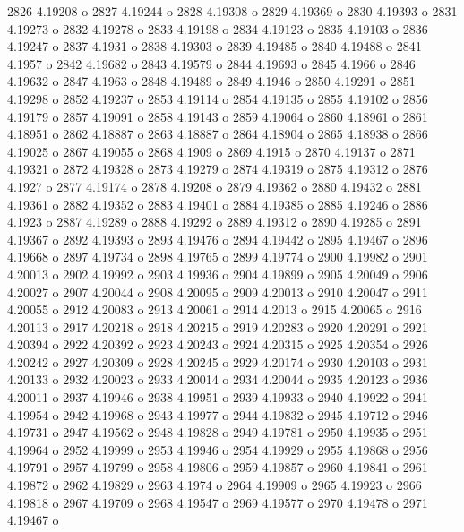  2826  4.19208  o
 2827  4.19244  o
 2828  4.19308  o
 2829  4.19369  o
 2830  4.19393  o
 2831  4.19273  o
 2832  4.19278  o
 2833  4.19198  o
 2834  4.19123  o
 2835  4.19103  o
 2836  4.19247  o
 2837  4.1931  o
 2838  4.19303  o
 2839  4.19485  o
 2840  4.19488  o
 2841  4.1957  o
 2842  4.19682  o
 2843  4.19579  o
 2844  4.19693  o
 2845  4.1966  o
 2846  4.19632  o
 2847  4.1963  o
 2848  4.19489  o
 2849  4.1946  o
 2850  4.19291  o
 2851  4.19298  o
 2852  4.19237  o
 2853  4.19114  o
 2854  4.19135  o
 2855  4.19102  o
 2856  4.19179  o
 2857  4.19091  o
 2858  4.19143  o
 2859  4.19064  o
 2860  4.18961  o
 2861  4.18951  o
 2862  4.18887  o
 2863  4.18887  o
 2864  4.18904  o
 2865  4.18938  o
 2866  4.19025  o
 2867  4.19055  o
 2868  4.1909  o
 2869  4.1915  o
 2870  4.19137  o
 2871  4.19321  o
 2872  4.19328  o
 2873  4.19279  o
 2874  4.19319  o
 2875  4.19312  o
 2876  4.1927  o
 2877  4.19174  o
 2878  4.19208  o
 2879  4.19362  o
 2880  4.19432  o
 2881  4.19361  o
 2882  4.19352  o
 2883  4.19401  o
 2884  4.19385  o
 2885  4.19246  o
 2886  4.1923  o
 2887  4.19289  o
 2888  4.19292  o
 2889  4.19312  o
 2890  4.19285  o
 2891  4.19367  o
 2892  4.19393  o
 2893  4.19476  o
 2894  4.19442  o
 2895  4.19467  o
 2896  4.19668  o
 2897  4.19734  o
 2898  4.19765  o
 2899  4.19774  o
 2900  4.19982  o
 2901  4.20013  o
 2902  4.19992  o
 2903  4.19936  o
 2904  4.19899  o
 2905  4.20049  o
 2906  4.20027  o
 2907  4.20044  o
 2908  4.20095  o
 2909  4.20013  o
 2910  4.20047  o
 2911  4.20055  o
 2912  4.20083  o
 2913  4.20061  o
 2914  4.2013  o
 2915  4.20065  o
 2916  4.20113  o
 2917  4.20218  o
 2918  4.20215  o
 2919  4.20283  o
 2920  4.20291  o
 2921  4.20394  o
 2922  4.20392  o
 2923  4.20243  o
 2924  4.20315  o
 2925  4.20354  o
 2926  4.20242  o
 2927  4.20309  o
 2928  4.20245  o
 2929  4.20174  o
 2930  4.20103  o
 2931  4.20133  o
 2932  4.20023  o
 2933  4.20014  o
 2934  4.20044  o
 2935  4.20123  o
 2936  4.20011  o
 2937  4.19946  o
 2938  4.19951  o
 2939  4.19933  o
 2940  4.19922  o
 2941  4.19954  o
 2942  4.19968  o
 2943  4.19977  o
 2944  4.19832  o
 2945  4.19712  o
 2946  4.19731  o
 2947  4.19562  o
 2948  4.19828  o
 2949  4.19781  o
 2950  4.19935  o
 2951  4.19964  o
 2952  4.19999  o
 2953  4.19946  o
 2954  4.19929  o
 2955  4.19868  o
 2956  4.19791  o
 2957  4.19799  o
 2958  4.19806  o
 2959  4.19857  o
 2960  4.19841  o
 2961  4.19872  o
 2962  4.19829  o
 2963  4.1974  o
 2964  4.19909  o
 2965  4.19923  o
 2966  4.19818  o
 2967  4.19709  o
 2968  4.19547  o
 2969  4.19577  o
 2970  4.19478  o
 2971  4.19467  o
